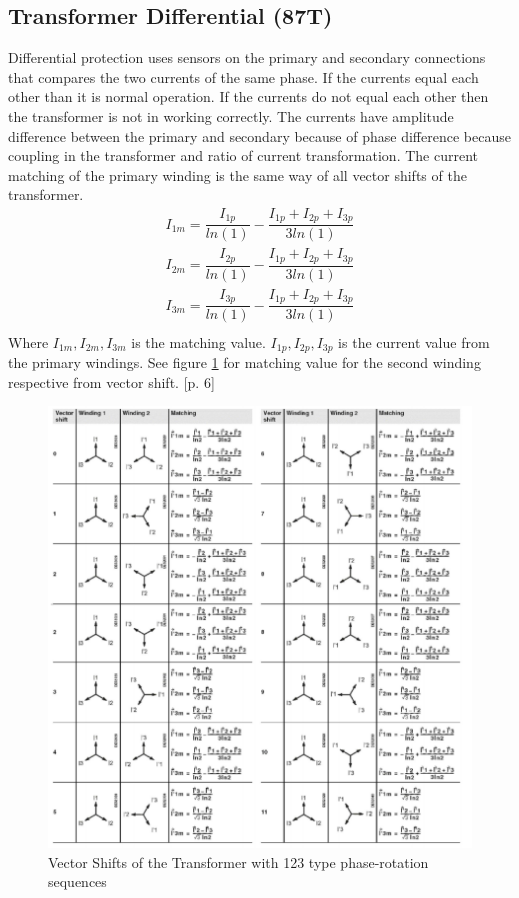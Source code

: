 {\subsection{Transformer Differential (87T)}
Differential protection \cite{Trans_Diff87T} uses sensors on the primary and secondary connections that compares the two currents of the same phase.  If the currents equal each other than it is normal operation.  If the currents do not equal each other then the transformer is not in working correctly. The currents have amplitude difference between the primary and secondary because of phase difference because coupling in the transformer and ratio of current transformation.
The current matching of the primary winding is the same way of all vector shifts of the transformer.
\begin{equation}
\begin{split}
I_{1m} = \dfrac{I_{1p}}{ln(1)}- \dfrac{I_{1p}+I_{2p}+I_{3p}}{3ln(1)}\\
I_{2m} = \dfrac{I_{2p}}{ln(1)}- \dfrac{I_{1p}+I_{2p}+I_{3p}}{3ln(1)}\\
I_{3m} = \dfrac{I_{3p}}{ln(1)}- \dfrac{I_{1p}+I_{2p}+I_{3p}}{3ln(1)}\\
\end{split}
\end{equation} 
Where $I_{1m},I_{2m},I_{3m}$ is the matching value. $I_{1p},I_{2p},I_{3p}$ is the current value from the primary windings. See figure \ref{Fig: Vector shifts of transformer} for matching value for the second winding respective from vector shift. \cite{Trans_Diff87T}[p. 6]
\newpage
\begin{figure}[h!]
\center
\includegraphics[scale=0.8]{graphics/Vector_Shift.png}
\caption{Vector Shifts of the Transformer with 123 type phase-rotation sequences}
\label{Fig: Vector shifts of transformer}
\end{figure}
}{}

